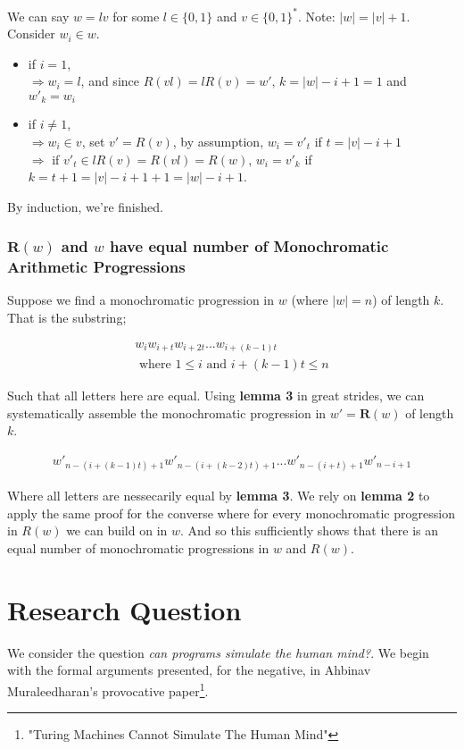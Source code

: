 \documentclass{article}
\begin{document}
We can say $w = lv$ for some $l \in \{0,1\}$ and $v \in \{0,1\}^*$. Note: $|w|=|v|+1$. Consider $w_i \in w$.
\begin{itemize}
	\item if $i=1$, \\
		$\Rightarrow w_i=l$, and since $R(vl) = lR(v) = w'$, $k=|w|-i+1=1$ and $w'_k=w_i$
	\item if $i\not=1$, \\
		$\Rightarrow w_i\in v$, set $v' = R(v)$, by assumption, $w_i=v'_t$ if $t=|v|-i+1$ \\
		$\Rightarrow$ if $v'_t \in lR(v) = R(vl) = R(w)$, $w_i=v'_k$ if \\
		$k=t+1=|v|-i+1+1=|w|-i+1$.
\end{itemize}
By induction, we're finished.

\subsubsection*{$\bm{R}(w)$ and $w$ have equal number of Monochromatic Arithmetic Progressions}
Suppose we find a monochromatic progression in $w$ (where $|w|=n$) of length $k$. That is the substring;

\begin{align*}
	w_iw_{i+t}w_{i+2t}...w_{i+(k-1)t} \\
	\text{ where } 1 \leq i \text{ and } i+(k-1)t \leq n
\end{align*}

Such that all letters here are equal. Using \textbf{lemma 3} in great strides, we can systematically assemble the monochromatic progression in $w' = \bm{R}(w)$ of length $k$.

\begin{align*}
	w'_{n - (i+(k-1)t) + 1}w'_{n - (i+(k-2)t) + 1}...w'_{n - (i+t) + 1}w'_{n - i + 1}
\end{align*}

Where all letters are nessecarily equal by \textbf{lemma 3}. We rely on \textbf{lemma 2} to apply the same proof for the converse where for every monochromatic progression in $R(w)$ we can build on in $w$. And so this sufficiently shows that there is an equal number of monochromatic progressions in $w$ and $R(w)$.

\section*{Research Question}
We consider the question \emph{can programs simulate the human mind?}. We begin with the formal arguments presented, for the negative, in Ahbinav Muraleedharan's provocative paper\footnote{"Turing Machines Cannot Simulate The Human Mind"}.
\end{document}
